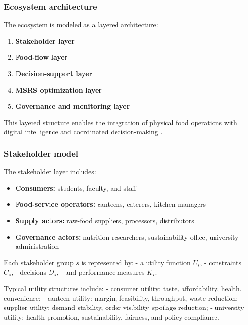 \subsubsection{Ecosystem architecture}\label{ecosystem-architecture}

The ecosystem is modeled as a layered architecture:

\begin{enumerate}
\def\labelenumi{\arabic{enumi}.}
\tightlist
\item
  \textbf{Stakeholder layer}
\item
  \textbf{Food-flow layer}
\item
  \textbf{Decision-support layer}
\item
  \textbf{MSRS optimization layer}
\item
  \textbf{Governance and monitoring layer}
\end{enumerate}

This layered structure enables the integration of physical food
operations with digital intelligence and coordinated decision-making
\citep{zheng2017msr, wu2021multifr}.

\subsubsection{Stakeholder model}\label{stakeholder-model}

The stakeholder layer includes:

\begin{itemize}
\tightlist
\item
  \textbf{Consumers:} students, faculty, and staff
\item
  \textbf{Food-service operators:} canteens, caterers, kitchen managers
\item
  \textbf{Supply actors:} raw-food suppliers, processors, distributors
\item
  \textbf{Governance actors:} nutrition researchers, sustainability
  office, university administration
\end{itemize}

Each stakeholder group \(s\) is represented by: - a utility function
\(U_s\), - constraints \(C_s\), - decisions \(D_s\), - and performance
measures \(K_s\).

Typical utility structures include: - consumer utility: taste,
affordability, health, convenience; - canteen utility: margin,
feasibility, throughput, waste reduction; - supplier utility: demand
stability, order visibility, spoilage reduction; - university utility:
health promotion, sustainability, fairness, and policy compliance.

